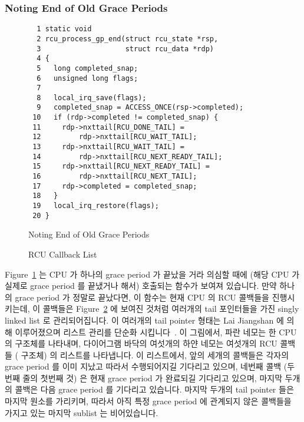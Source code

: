 \subsubsection{Noting End of Old Grace Periods}
\label{app:rcuimpl:rcutreewt:Noting End of Old Grace Periods}

\begin{figure}[tbp]
{ \scriptsize
\begin{verbatim}
  1 static void
  2 rcu_process_gp_end(struct rcu_state *rsp,
  3                    struct rcu_data *rdp)
  4 {
  5   long completed_snap;
  6   unsigned long flags;
  7
  8   local_irq_save(flags);
  9   completed_snap = ACCESS_ONCE(rsp->completed);
 10   if (rdp->completed != completed_snap) {
 11     rdp->nxttail[RCU_DONE_TAIL] =
 12         rdp->nxttail[RCU_WAIT_TAIL];
 13     rdp->nxttail[RCU_WAIT_TAIL] =
 14         rdp->nxttail[RCU_NEXT_READY_TAIL];
 15     rdp->nxttail[RCU_NEXT_READY_TAIL] =
 16         rdp->nxttail[RCU_NEXT_TAIL];
 17     rdp->completed = completed_snap;
 18   }
 19   local_irq_restore(flags);
 20 }
\end{verbatim}
}
\caption{Noting End of Old Grace Periods}
\label{fig:app:rcuimpl:rcutreewt:Noting End of Old Grace Periods}
\end{figure}

\begin{figure}[tb]
\centering
{}
\caption{RCU Callback List}
\label{fig:app:rcuimpl:rcutree:RCU Callback List}
\end{figure}

Figure~\ref{fig:app:rcuimpl:rcutreewt:Noting End of Old Grace Periods}
는 CPU 가 하나의 grace period 가 끝났을 거라 의심할 때에 (해당 CPU 가 실제로
grace period 를 끝냈거나 해서) 호출되는  함수가 보여져
있습니다.
만약 하나의 grace period 가 정말로 끝났다면, 이 함수는 현재 CPU 의 RCU 콜백들을
진행시키는데, 이 콜백들은
Figure~\ref{fig:app:rcuimpl:rcutree:RCU Callback List} 에 보여진 것처럼
여러개의 tail 포인터들을 가진 singly linked list 로 관리되어집니다.
이 여러개의 tail pointer 형태는 Lai Jiangshan 에 의해 이루어졌으며 리스트
관리를 단순화 시킵니다~\cite{LaiJiangshan2008NewClassicAlgorithm}.
이 그림에서, 파란 네모는 한 CPU 의  구조체를 나타내며, 다이어그램
바닥의 여섯개의 하얀 네모는 여섯개의 RCU 콜백들 ( 구조체) 의
리스트를 나타냅니다.
이 리스트에서, 앞의 세개의 콜백들은 각자의 grace period 를 이미 지났고 따라서
수행되어지길 기다리고 있으며, 네번째 콜백 (두번째 줄의 첫번째 것) 은 현재 grace
period 가 완료되길 기다리고 있으며, 마지막 두개의 콜백은 다음 grace period 를
기다리고 있습니다.
마지막 두개의 tail pointer 들은 마지막 원소를 가리키며, 따라서 아직 특정 grace
period 에 관계되지 않은 콜백들을 가지고 있는 마지막 sublist 는 비어있습니다.
\iffalse

